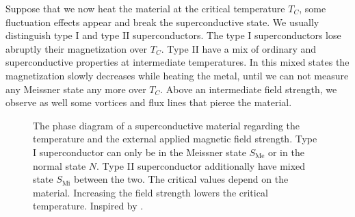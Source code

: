 \documentclass[../main.tex]{subfile}
\begin{document}
Suppose that we now heat the material at the critical temperature $T_C$, some fluctuation effects appear and break the superconductive state.
We usually distinguish type I and type II superconductors. The type I superconductors
lose abruptly their magnetization over $T_C$. Type II have a mix of ordinary and superconductive properties at intermediate temperatures.
 In this mixed states the magnetization slowly decreases while heating the metal,
 until we can not measure any Meissner state any more over $T_C$. Above an intermediate field strength, we observe as well some vortices
  and flux lines that pierce the material.\\
 \begin{figure}[H]\centering

    
        \caption{The phase diagram of a superconductive material regarding the temperature and the external applied magnetic field strength. Type I superconductor can only be in 
        the Meissner state $S_{\text{Me}}$ or in the normal state $N$. Type II superconductor additionally have mixed state $S_{\text{Mi}}$ between the two. The critical values depend on the material.
        Increasing the field strength lowers the critical temperature. Inspired by \cite{FossheimSudbo2004}.}
    \end{figure}
 
\end{document}
